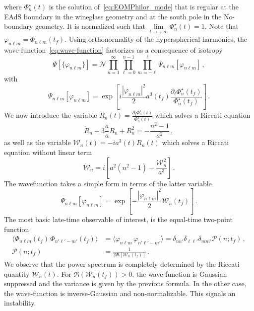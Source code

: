 \documentclass[a4paper,11pt]{article}
\begin{document}
where $\Phi^{\star}_{n}(t)$ is the solution of~\eqref{eq:EOMPhilor_mode} that is regular at the EAdS boundary in the wineglass geometry and at the south pole in the No-boundary geometry. It is normalized such that $\underset{t\to +\infty}{\lim}\Phi_{n}^{\star}(t)=1$. Note that $\varphi_{n \ell m } = \Phi_{n \ell m}(t_f)$. Using orthonormality of the hyperspherical harmonics, the wave-function~\eqref{eq:wave-function} factorizes as a consequence of isotropy
\begin{equation}
    \Psi[\{\varphi_{n \ell m}\}]= \mathcal{N}\prod_{n=1}^{\infty}\prod_{\ell=0}^{n-1}\prod_{m=-\ell}^{\ell}\Psi_{n \ell m}[\varphi_{n \ell m}]\,,
\end{equation}
with
\begin{equation}
    \Psi_{n \ell m}[\varphi_{n \ell m}]= \exp\left[i\frac{|\varphi_{n \ell m}|^2}{2}a^3(t_f)\frac{\partial_t\Phi^{\star}_n(t_f)}{\Phi_n^\star(t_f)}\right]\,.
\end{equation}
We now introduce the variable $R_n(t)=\frac{\partial_t \Phi^\star_n(t)}{\Phi^\star_n(t)}$ which solves a Riccati equation
\begin{equation}\label{eq:Riccati_equation_Lor}
    \dot{R}_n+3\frac{\dot{a}}{a}R_n+R_n^2 = -\frac{n^2-1}{a^2}\,,
\end{equation}
as well as the variable $\mathcal{W}_n(t)=-ia^3(t)R_n(t)$ which solves a Riccati equation without linear term
\begin{equation}\label{eq:Riccati_W}
    \dot{\mathcal{W}}_n = i \left[a^2 (n^2-1) -\frac{\mathcal{W}_n^2}{a^3}\right]\,.
\end{equation}
The wavefunction takes a simple form in terms of the latter variable
\begin{equation}\label{eq:final_general}
     \Psi_{n \ell m}[\varphi_{n \ell m}] = \exp\left[-\frac{|\varphi_{n \ell m}|^2}{2}\mathcal{W}_n(t_f)\right]\,.
\end{equation}
The most basic late-time observable of interest, is the equal-time two-point function
\begin{equation}\label{eq:power_spectrum_1}
\begin{aligned}
      \langle \Phi_{n \ell m}(t_f)\,\Phi_{n' \ell' -m'}(t_f)\rangle&=\langle \varphi_{n \ell m}\,\varphi_{n' \ell' -m'}\rangle = \delta_{n n'}\delta_{\ell \ell'} \delta_{m m'}\mathcal{P}(n;t_f)\,,\\
      \mathcal{P}(n;t_f) &= \frac{1}{2\Re\left[\mathcal{W}_n(t_f)\right]}\,.
\end{aligned}
\end{equation}
We observe that the power spectrum is completely determined by the Riccati quantity $\mathcal{W}_n(t)$. For $\Re(\mathcal{W}_n(t_f))>0$, the wave-function is Gaussian suppressed and the variance is given by the previous formula. In the other case, the wave-function is inverse-Gaussian and non-normalizable. This signals an instability.
\end{document}
